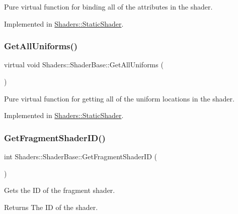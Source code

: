 Pure virtual function for binding all of the attributes in the shader. 

Implemented in \hyperlink{class_shaders_1_1_static_shader_a4ba0a1e7a4d2b58668f97cb9e3892f57}{Shaders\+::\+Static\+Shader}.

\mbox{\label{class_shaders_1_1_shader_base_ade949aa1626fbddd264a51b1dbb9a7cc}} 
\subsubsection{\texorpdfstring{Get\+All\+Uniforms()}{GetAllUniforms()}}
{\footnotesize\ttfamily virtual void Shaders\+::\+Shader\+Base\+::\+Get\+All\+Uniforms (\begin{DoxyParamCaption}{ }\end{DoxyParamCaption})\hspace{0.3cm}{\ttfamily [pure virtual]}}

Pure virtual function for getting all of the uniform locations in the shader. 

Implemented in \hyperlink{class_shaders_1_1_static_shader_a2417ca33a617fe8a8cb30ec3b5e866fa}{Shaders\+::\+Static\+Shader}.

\mbox{\label{class_shaders_1_1_shader_base_a4cc693649848978b8496359eec993a31}} 
\subsubsection{\texorpdfstring{Get\+Fragment\+Shader\+I\+D()}{GetFragmentShaderID()}}
{\footnotesize\ttfamily int Shaders\+::\+Shader\+Base\+::\+Get\+Fragment\+Shader\+ID (\begin{DoxyParamCaption}{ }\end{DoxyParamCaption})}

Gets the ID of the fragment shader. \begin{DoxyReturn}{Returns}
The ID of the shader. 
\end{DoxyReturn}


